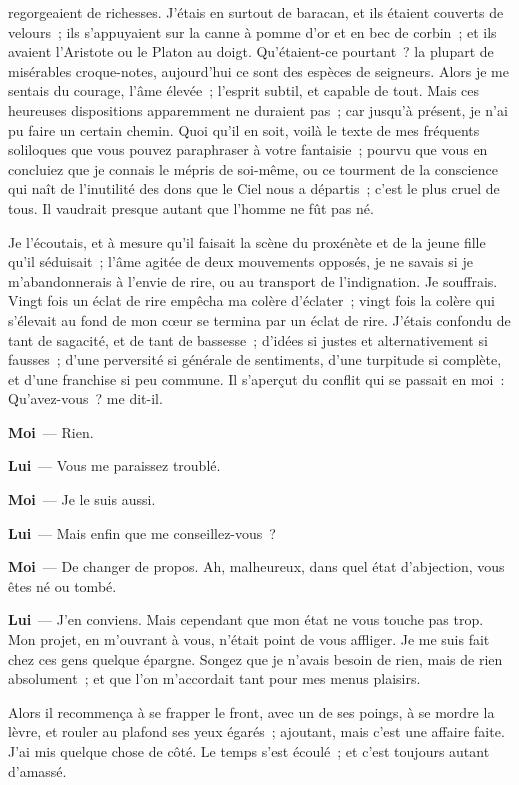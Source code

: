 \documentclass[french,twoside]{book} %
\newcommand{\labelchar}[1]{\textbf{\color{rubric} #1}}
\begin{document}
regorgeaient de richesses. J’étais en surtout de baracan, et ils étaient couverts de velours ; ils s’appuyaient sur la canne à pomme d’or et en bec de corbin ; et ils avaient l’Aristote ou le Platon au doigt. Qu’étaient-ce pourtant ? la plupart de misérables croque-notes, aujourd’hui ce sont des espèces de seigneurs. Alors je me sentais du courage, l’âme élevée ; l’esprit subtil, et capable de tout. Mais ces heureuses dispositions apparemment ne duraient pas ; car jusqu’à présent, je n’ai pu faire un certain chemin. Quoi qu’il en soit, voilà le texte de mes fréquents soliloques que vous pouvez paraphraser à votre fantaisie ; pourvu que vous en concluiez que je connais le mépris de soi-même, ou ce tourment de la conscience qui naît de l’inutilité des dons que le Ciel nous a départis ; c’est le plus cruel de tous. Il vaudrait presque autant que l’homme ne fût pas né.\par
Je l’écoutais, et à mesure qu’il faisait la scène du proxénète et de la jeune fille qu’il séduisait ; l’âme agitée de deux mouvements opposés, je ne savais si je m’abandonnerais à l’envie de rire, ou au transport de l’indignation. Je souffrais. Vingt fois un éclat de rire empêcha ma colère d’éclater ; vingt fois la colère qui s’élevait au fond de mon cœur se termina par un éclat de rire. J’étais confondu de tant de sagacité, et de tant de bassesse ; d’idées si justes et alternativement si fausses ; d’une perversité si générale de sentiments, d’une turpitude si complète, et d’une franchise si peu commune. Il s’aperçut du conflit qui se passait en moi : Qu’avez-vous ? me dit-il.\par
\labelchar{Moi} — Rien.\par
\labelchar{Lui} — Vous me paraissez troublé.\par
\labelchar{Moi} — Je le suis aussi.\par
\labelchar{Lui} — Mais enfin que me conseillez-vous ?\par
\labelchar{Moi} — De changer de propos. Ah, malheureux, dans quel état d’abjection, vous êtes né ou tombé.\par
\labelchar{Lui} — J’en conviens. Mais cependant que mon état ne vous touche pas trop. Mon projet, en m’ouvrant à vous, n’était point de vous affliger. Je me suis fait chez ces gens quelque épargne. Songez que je n’avais besoin de rien, mais de rien absolument ; et que l’on m’accordait tant pour mes menus plaisirs.\par
Alors il recommença à se frapper le front, avec un de ses poings, à se mordre la lèvre, et rouler au plafond ses yeux égarés ; ajoutant, mais c’est une affaire faite. J’ai mis quelque chose de côté. Le temps s’est écoulé ; et c’est toujours autant d’amassé.\par
\end{document}
